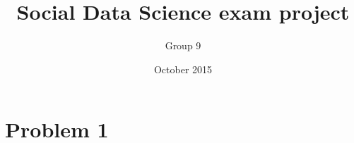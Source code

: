 \documentclass[12pt]{article}
\title{Social Data Science exam project}
\author{Group 9}
\date{October 2015}
\begin{document}
\maketitle

	\section{Problem 1} %
	\label{sec:problem_1}

	
\end{document}
